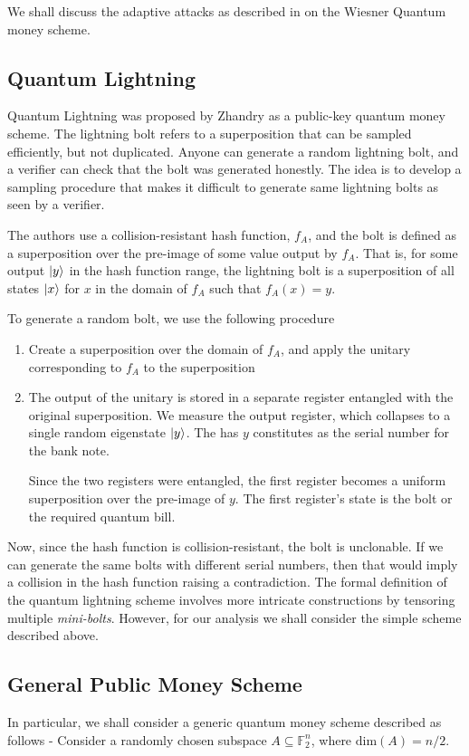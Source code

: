 \documentclass[]{article}
\newcommand{\F}{\mathbb F}
\begin{document}
We shall discuss the adaptive attacks as described in \cite{adaptive_attacks} on the Wiesner Quantum money scheme. 

\subsection{Quantum Lightning}
Quantum Lightning was proposed by Zhandry \cite{quantum_lightning} as a public-key quantum money scheme. The lightning bolt refers to a superposition that can be sampled efficiently, but not duplicated. Anyone can generate a random lightning bolt, and a verifier can check that the bolt was generated honestly. The idea is to develop a sampling procedure that makes it difficult to generate same lightning bolts as seen by a verifier.

The authors use a collision-resistant hash function, $f_A$, and the bolt is defined as a superposition over the pre-image of some value output by $f_A$. That is, for some output $\ket{y}$ in the hash function range, the lightning bolt is a superposition of all states $\ket{x}$ for $x$ in the domain of $f_A$ such that $f_A(x) = y$.

To generate a random bolt, we use the following procedure
\begin{enumerate}
    \item Create a superposition over the domain of $f_A$, and  apply the unitary corresponding to $f_A$ to the superposition
    \item The output of the unitary is stored in a separate register entangled with the original superposition. We measure the output register, which collapses to a single random eigenstate $\ket{y}$. The has $y$ constitutes as the serial number for the bank note. 
    
    Since the two registers were entangled, the first register becomes a uniform superposition over the pre-image of $y$. The first register's state is the bolt or the required quantum bill.
\end{enumerate}

Now, since the hash function is collision-resistant, the bolt is unclonable. If we can generate the same bolts with different serial numbers, then that would imply a collision in the hash function raising a contradiction. The formal definition of the quantum lightning scheme involves more intricate constructions by tensoring multiple \textit{mini-bolts}. However, for our analysis we shall consider the simple scheme described above.

\subsection{General Public Money Scheme}
In particular, we shall consider a generic quantum money scheme described as follows - 
Consider a randomly chosen subspace $A \subseteq \F^{n}_2$, where $\text{dim}(A) = n/2$.
\end{document}
